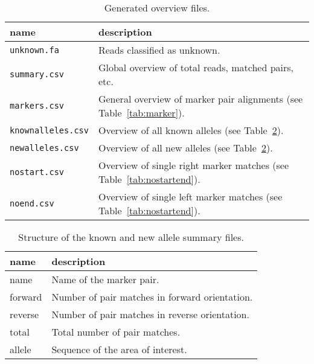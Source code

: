\documentclass{article}
\begin{document}
\begin{table}[h]
  \caption{Generated overview files.}
  \label{tab:overview}
  \begin{center}
    \begin{tabular}{l|l}
      name & description\\
      \hline
      \texttt{unknown.fa}       & Reads classified as unknown.\\
      \texttt{summary.csv}      & Global overview of total reads, matched
        pairs, etc.\\
      \texttt{markers.csv}      & General overview of marker pair alignments
        (see Table~\ref{tab:marker}).\\
      \texttt{knownalleles.csv} & Overview of all known alleles (see
        Table~\ref{tab:knownnew}).\\
      \texttt{newalleles.csv}   & Overview of all new alleles (see
        Table~\ref{tab:knownnew}).\\
      \texttt{nostart.csv}      & Overview of single right marker matches (see
        Table~\ref{tab:nostartend}).\\
      \texttt{noend.csv}        & Overview of single left marker matches (see
        Table~\ref{tab:nostartend}).\\
    \end{tabular}
  \end{center}
\end{table}

\begin{table}[h]
  \caption{Structure of the known and new allele summary files.}
  \label{tab:knownnew}
  \begin{center}
    \begin{tabular}{l|l}
      name & description\\
      \hline
      name    & Name of the marker pair.\\
      forward & Number of pair matches in forward orientation.\\
      reverse & Number of pair matches in reverse orientation.\\
      total   & Total number of pair matches.\\
      allele  & Sequence of the area of interest.\\
    \end{tabular}
  \end{center}
\end{table}
\end{document}

